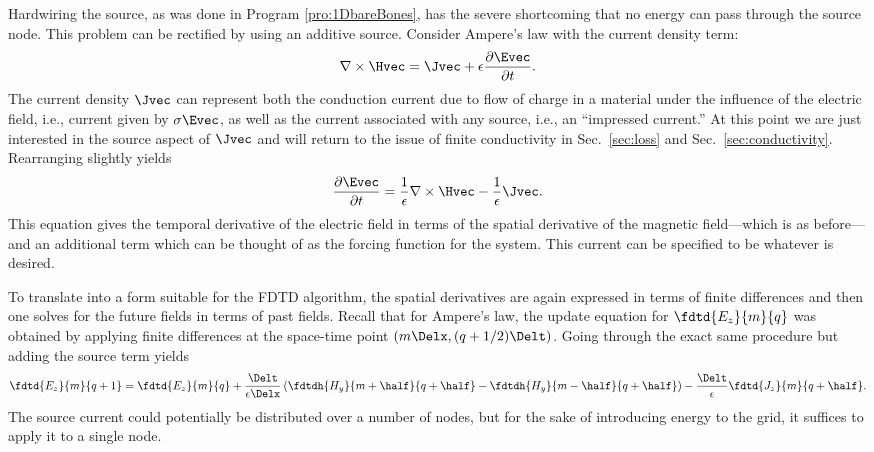 Hardwiring the source, as was done in Program \ref{pro:1DbareBones},
has the severe shortcoming that no energy can pass through the source
node.  This problem can be rectified by using an additive source.
Consider Ampere's law with the current density term:
\begin{equation}
  \nabla\times\Hvec = \Jvec + 
                      \epsilon\frac{\partial \Evec}{\partial t}.
  \label{eq:ampereWithCurrent}
\end{equation}
The current density $\Jvec$ can represent both the conduction current
due to flow of charge in a material under the influence of the
electric field, i.e., current given by $\sigma\Evec$, as well as the
current associated with any source, i.e., an ``impressed current.''
At this point we are just interested in the source aspect of $\Jvec$
and will return to the issue of finite conductivity in Sec.\
\ref{sec:loss} and Sec.\ \ref{sec:conductivity}.  Rearranging
 slightly yields
\begin{equation}
  \frac{\partial \Evec}{\partial t} =
     \frac{1}{\epsilon} \nabla\times\Hvec - \frac{1}{\epsilon}\Jvec.
  \label{eq:ampereTweak}
\end{equation}
This equation gives the temporal derivative of the electric field in
terms of the spatial derivative of the magnetic field---which is as
before---and an additional term which can be thought of as the forcing
function for the system.  This current can be specified to be whatever
is desired.

To translate  into a form suitable for the FDTD
algorithm, the spatial derivatives are again expressed in terms of
finite differences and then one solves for the future fields in terms
of past fields.  Recall that for Ampere's law, the update equation for
$\fdtd{E_z}{m}{q}$ was obtained by applying finite differences at the
space-time point $(m\Delx,(q+1/2)\Delt)$.  Going through the exact
same procedure but adding the source term yields
\begin{equation}
  \fdtd{E_z}{m}{q+1} = \fdtd{E_z}{m}{q} + 
  \frac{\Delt}{\epsilon\Delx}
   \left(\fdtdh{H_y}{m+\half}{q+\half} - \fdtdh{H_y}{m-\half}{q+\half}\right)
  - \frac{\Delt}{\epsilon}\fdtd{J_z}{m}{q+\half}.
  \label{eq:updateEzSource}
\end{equation}
The source current could potentially be distributed over a number of
nodes, but for the sake of introducing energy to the grid, it suffices
to apply it to a single node.

